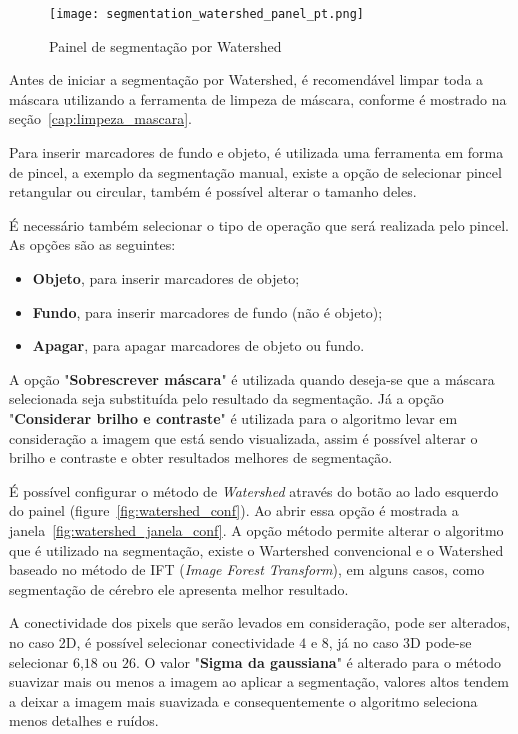 \begin{figure}[!htb]
\centering
\texttt{[image: segmentation\_watershed\_panel\_pt.png]}
\caption{Painel de segmentação por Watershed}
\label{fig:watershed_painel}
\end{figure}

Antes de iniciar a segmentação por Watershed, é recomendável limpar toda a máscara utilizando a ferramenta de limpeza de máscara, conforme é mostrado na seção~\ref{cap:limpeza_mascara}.

Para inserir marcadores de fundo e objeto, é utilizada uma ferramenta em forma de pincel, a exemplo da segmentação manual, existe a opção de selecionar pincel retangular ou circular, também é possível alterar o tamanho deles. 

É necessário também selecionar o tipo de operação que será realizada pelo pincel. As opções são as
seguintes:
\begin{itemize}
\item \textbf{Objeto}, para inserir marcadores de objeto;
\item \textbf{Fundo}, para inserir marcadores de fundo (não é objeto);
\item \textbf{Apagar}, para apagar marcadores de objeto ou fundo.
\end{itemize}

A opção "\textbf{Sobrescrever máscara}" é utilizada quando deseja-se que a máscara selecionada seja substituída pelo resultado da segmentação. Já a opção "\textbf{Considerar brilho e contraste}" é utilizada para o algoritmo levar em consideração a imagem que está sendo visualizada, assim é possível alterar o brilho e contraste e obter resultados melhores de segmentação.

É possível configurar o método de \textit{Watershed} através do botão ao lado esquerdo do painel (figure~\ref{fig:watershed_conf}). Ao abrir essa opção é mostrada a janela~\ref{fig:watershed_janela_conf}. A opção método permite alterar o algoritmo que é utilizado na segmentação, existe o Wartershed convencional e o Watershed baseado no método de IFT (\textit{Image Forest Transform}), em alguns casos, como segmentação de cérebro ele apresenta melhor resultado.

A conectividade dos pixels que serão levados em consideração, pode ser alterados, no caso 2D, é possível selecionar conectividade $4$ e $8$, já no caso 3D pode-se selecionar $6$,$18$ ou $26$. O valor "\textbf{Sigma da gaussiana}" é alterado para o método suavizar mais ou menos a imagem ao aplicar a segmentação, valores altos tendem a deixar a imagem mais suavizada e consequentemente o algoritmo seleciona menos detalhes e ruídos.

